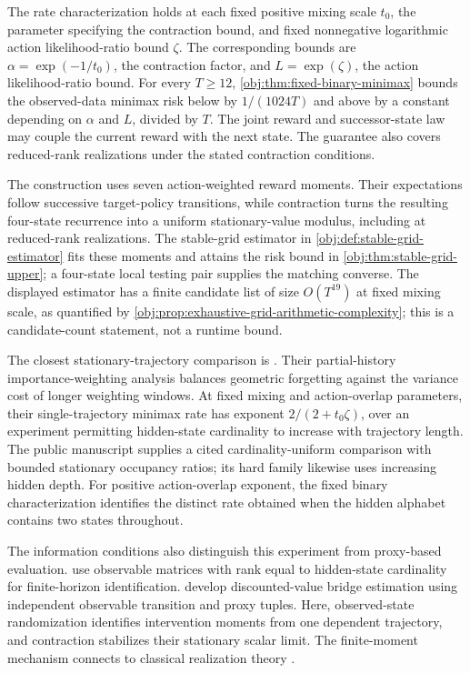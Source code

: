 The rate characterization holds at each fixed positive mixing scale \(t_0\), the parameter specifying the contraction bound, and fixed nonnegative logarithmic action likelihood-ratio bound \(\zeta\). The corresponding bounds are \(\alpha=\exp(-1/t_0)\), the contraction factor, and \(L=\exp(\zeta)\), the action likelihood-ratio bound. For every \(T\geq12\), \cref{obj:thm:fixed-binary-minimax} bounds the observed-data minimax risk below by \(1/(1024T)\) and above by a constant depending on \(\alpha\) and \(L\), divided by \(T\). The joint reward and successor-state law may couple the current reward with the next state. The guarantee also covers reduced-rank realizations under the stated contraction conditions.

The construction uses seven action-weighted reward moments. Their expectations follow successive target-policy transitions, while contraction turns the resulting four-state recurrence into a uniform stationary-value modulus, including at reduced-rank realizations. The stable-grid estimator in \cref{obj:def:stable-grid-estimator} fits these moments and attains the risk bound in \cref{obj:thm:stable-grid-upper}; a four-state local testing pair supplies the matching converse. The displayed estimator has a finite candidate list of size \(O(T^{19})\) at fixed mixing scale, as quantified by \cref{obj:prop:exhaustive-grid-arithmetic-complexity}; this is a candidate-count statement, not a runtime bound.

The closest stationary-trajectory comparison is \citet[Theorem 2.1, Corollary 2.2, and Theorem 3.1]{HuWager2023}. Their partial-history importance-weighting analysis balances geometric forgetting against the variance cost of longer weighting windows. At fixed mixing and action-overlap parameters, their single-trajectory minimax rate has exponent \(2/(2+t_0\zeta)\), over an experiment permitting hidden-state cardinality to increase with trajectory length. The public manuscript \citet[Theorem 1 (Uniform overlap frontier) and the Signed-depth family definition]{CausalSmithLatentOverlap2026} supplies a cited cardinality-uniform comparison with bounded stationary occupancy ratios; its hard family likewise uses increasing hidden depth. For positive action-overlap exponent, the fixed binary characterization identifies the distinct rate obtained when the hidden alphabet contains two states throughout.

The information conditions also distinguish this experiment from proxy-based evaluation. \citet[Section 4, Assumptions 2--4, and Theorems 2--4]{NairJiang2021} use observable matrices with rank equal to hidden-state cardinality for finite-horizon identification. \citet[Section 4 and Theorems 7--8]{ShiUeharaHuangJiang2022} develop discounted-value bridge estimation using independent observable transition and proxy tuples. Here, observed-state randomization identifies intervention moments from one dependent trajectory, and contraction stabilizes their stationary scalar limit. The finite-moment mechanism connects to classical realization theory \citep[pp.\ 545--548]{Ho1966}\citep[pp.\ 26--40]{Carlyle1971}.

